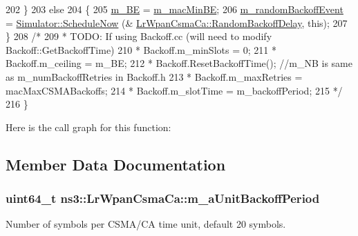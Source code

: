 \begin{DoxyCode}
202     \}
203   \textcolor{keywordflow}{else}
204     \{
205       \hyperlink{classns3_1_1LrWpanCsmaCa_a2d88adfd84e36bd42136e97adadb7f9d}{m\_BE} = \hyperlink{classns3_1_1LrWpanCsmaCa_a8e4fd67213592e79eda2550a1a03bf0c}{m\_macMinBE};
206       \hyperlink{classns3_1_1LrWpanCsmaCa_a426a65b1bf9433af0e88d7dd4b4b8e10}{m\_randomBackoffEvent} = \hyperlink{classns3_1_1Simulator_a2219ee02c0647adc83d1c918c3256266}{Simulator::ScheduleNow} (&
      \hyperlink{classns3_1_1LrWpanCsmaCa_a21224101ec7187a7f9560a36172841b8}{LrWpanCsmaCa::RandomBackoffDelay}, \textcolor{keyword}{this});
207     \}
208   \textcolor{comment}{/*}
209 \textcolor{comment}{  *  TODO: If using Backoff.cc (will need to modify Backoff::GetBackoffTime)}
210 \textcolor{comment}{  *        Backoff.m\_minSlots = 0;}
211 \textcolor{comment}{  *        Backoff.m\_ceiling = m\_BE;}
212 \textcolor{comment}{  *        Backoff.ResetBackoffTime(); //m\_NB is same as m\_numBackoffRetries in Backoff.h}
213 \textcolor{comment}{  *        Backoff.m\_maxRetries = macMaxCSMABackoffs;}
214 \textcolor{comment}{  *        Backoff.m\_slotTime = m\_backoffPeriod;}
215 \textcolor{comment}{  */}
216 \}
\end{DoxyCode}


Here is the call graph for this function\+:




\subsection{Member Data Documentation}
\subsubsection[{\texorpdfstring{m\+\_\+a\+Unit\+Backoff\+Period}{m_aUnitBackoffPeriod}}]{\setlength{\rightskip}{0pt plus 5cm}uint64\+\_\+t ns3\+::\+Lr\+Wpan\+Csma\+Ca\+::m\+\_\+a\+Unit\+Backoff\+Period\hspace{0.3cm}{\ttfamily [private]}}\hypertarget{classns3_1_1LrWpanCsmaCa_a0d93fb2ee7baf142892a71cfc068fd6c}{}\label{classns3_1_1LrWpanCsmaCa_a0d93fb2ee7baf142892a71cfc068fd6c}
Number of symbols per C\+S\+M\+A/\+CA time unit, default 20 symbols. 
